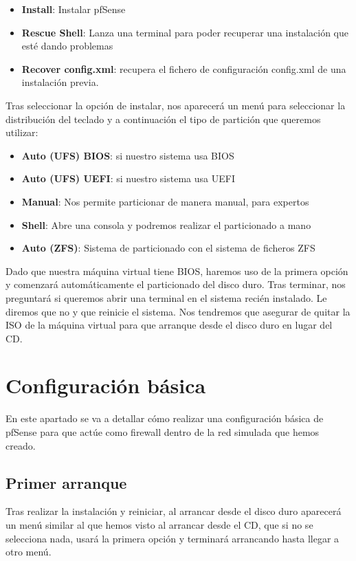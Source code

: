 \begin{itemize}
    \item \textbf{Install}: Instalar pfSense
    \item \textbf{Rescue Shell}: Lanza una terminal para poder recuperar una instalación que esté dando problemas
    \item \textbf{Recover config.xml}: recupera el fichero de configuración config.xml de una instalación previa.
\end{itemize}
Tras seleccionar la opción de instalar, nos aparecerá un menú para seleccionar la distribución del teclado y a continuación el tipo de partición que queremos utilizar:

\begin{itemize}
    \item \textbf{Auto (UFS) BIOS}: si nuestro sistema usa BIOS
    \item \textbf{Auto (UFS) UEFI}: si nuestro sistema usa UEFI
    \item \textbf{Manual}: Nos permite particionar de manera manual, para expertos
    \item \textbf{Shell}: Abre una consola y podremos realizar el particionado a mano
    \item \textbf{Auto (ZFS)}: Sistema de particionado con el sistema de ficheros ZFS
\end{itemize}

Dado que nuestra máquina virtual tiene BIOS, haremos uso de la primera opción y comenzará automáticamente el particionado del disco duro. Tras terminar, nos preguntará si queremos abrir una terminal en el sistema recién instalado. Le diremos que no y que reinicie el sistema. Nos tendremos que asegurar de quitar la ISO de la máquina virtual para que arranque desde el disco duro en lugar del CD.


\chapter{Configuración básica}
En este apartado se va a detallar cómo realizar una configuración básica de pfSense para que actúe como firewall dentro de la red simulada que hemos creado.


\section{Primer arranque}
Tras realizar la instalación y reiniciar, al arrancar  desde el disco duro aparecerá un menú similar al que hemos visto al arrancar desde el CD, que si no se selecciona nada, usará la primera opción y terminará arrancando hasta llegar a otro menú.

